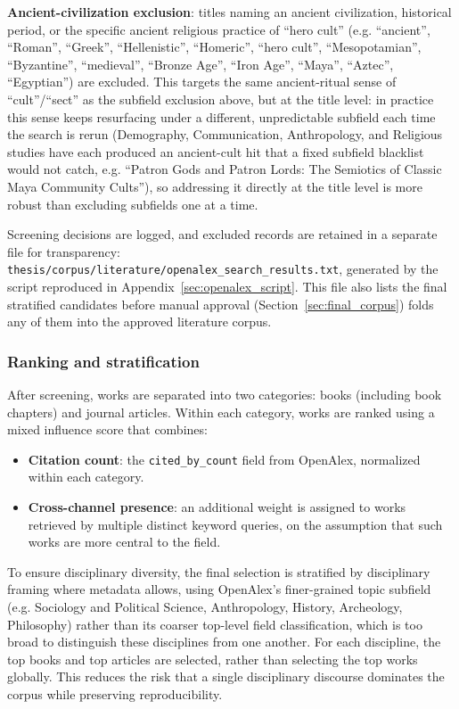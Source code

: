 \textbf{Ancient-civilization exclusion}: titles naming an ancient civilization, historical period, or the specific ancient religious practice of \enquote{hero cult} (e.g. \enquote{ancient}, \enquote{Roman}, \enquote{Greek}, \enquote{Hellenistic}, \enquote{Homeric}, \enquote{hero cult}, \enquote{Mesopotamian}, \enquote{Byzantine}, \enquote{medieval}, \enquote{Bronze Age}, \enquote{Iron Age}, \enquote{Maya}, \enquote{Aztec}, \enquote{Egyptian}) are excluded. This targets the same ancient-ritual sense of \enquote{cult}/\enquote{sect} as the subfield exclusion above, but at the title level: in practice this sense keeps resurfacing under a different, unpredictable subfield each time the search is rerun (Demography, Communication, Anthropology, and Religious studies have each produced an ancient-cult hit that a fixed subfield blacklist would not catch, e.g. \enquote{Patron Gods and Patron Lords: The Semiotics of Classic Maya Community Cults}), so addressing it directly at the title level is more robust than excluding subfields one at a time.

Screening decisions are logged, and excluded records are retained in a separate file for transparency: \texttt{thesis/corpus/literature/openalex\_search\_results.txt}, generated by the script reproduced in Appendix~\ref{sec:openalex_script}. This file also lists the final stratified candidates before manual approval (Section~\ref{sec:final_corpus}) folds any of them into the approved literature corpus.


\subsubsection{Ranking and stratification}
After screening, works are separated into two categories: books (including book chapters) and journal articles. Within each category, works are ranked using a mixed influence score that combines:
\begin{itemize}
    \item \textbf{Citation count}: the \verb+cited_by_count+ field from OpenAlex, normalized within each category.
    \item \textbf{Cross-channel presence}: an additional weight is assigned to works retrieved by multiple distinct keyword queries, on the assumption that such works are more central to the field.
\end{itemize}

To ensure disciplinary diversity, the final selection is stratified by disciplinary framing where metadata allows, using OpenAlex's finer-grained topic subfield (e.g. Sociology and Political Science, Anthropology, History, Archeology, Philosophy) rather than its coarser top-level field classification, which is too broad to distinguish these disciplines from one another. For each discipline, the top books and top articles are selected, rather than selecting the top works globally. This reduces the risk that a single disciplinary discourse dominates the corpus while preserving reproducibility.

